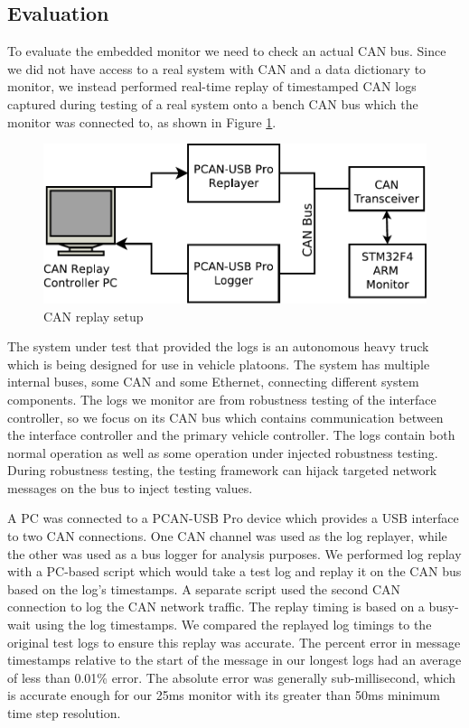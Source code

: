 \documentclass[]{llncs}
\begin{document}
\subsection{Evaluation}
\label{sec:eval:embedded}
To evaluate the embedded monitor we need to check an actual CAN bus.  Since we did not have access to a real system with CAN and a data dictionary to monitor, we instead performed real-time replay of timestamped CAN logs captured during testing of a real system onto a bench CAN bus which the monitor was connected to, as shown in Figure \ref{fig:eval:replaySchem}. 

\begin{figure}
\centering
\includegraphics[width=4.5in]{img/replay_arch}
\caption{CAN replay setup \label{fig:eval:replaySchem}}
\end{figure}
The system under test that provided the logs is an autonomous heavy truck which is being designed for use in vehicle platoons. %
The system has multiple internal buses, some CAN and some Ethernet, connecting different system components. The logs we monitor are from robustness testing of the interface controller, so we focus on its CAN bus which contains communication between the interface controller and the primary vehicle controller.
The logs contain both normal operation as well as some operation under injected robustness testing. During robustness testing, the testing framework can hijack targeted network messages on the bus to inject testing values. %

A PC was connected to a PCAN-USB Pro \cite{PCAN-USBPro} device which provides a USB interface to two CAN connections. One CAN channel was used as the log replayer, while the other was used as a bus logger for analysis purposes.
We performed log replay with a PC-based script which would take a test log and replay it on the CAN bus based on the log's timestamps. A separate script used the second CAN connection to log the CAN network traffic.
The replay timing is based on a busy-wait using the log timestamps. 
We compared the replayed log timings to the original test logs to ensure this replay was accurate. 
The percent error in message timestamps relative to the start of the message in our longest logs had an average of less than 0.01\% error. The absolute error was generally sub-millisecond, which is accurate enough for our 25ms monitor with its greater than 50ms minimum time step resolution.
\end{document}

